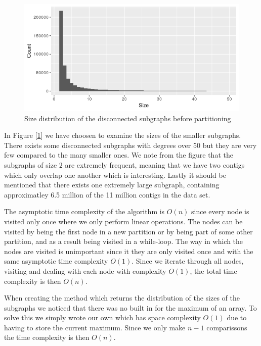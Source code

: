 \documentclass[a4paper,10pt]{article}
\newcommand\bref[1]{[\ref{#1}]}
\begin{document}
\begin{figure}[H]
	\centering
	\includegraphics[width=0.85\linewidth]{sizesprior.png}
	\caption{Size distribution of the disconnected subgraphs before partitioning}
	\label{fig:sizeprior}
\end{figure}

In Figure \bref{fig:sizeprior} we have choosen to examine the sizes of the smaller subgraphs. 
There exists some disconnected subgraphs with degrees over 50 but they are very few compared to the many smaller ones.
We note from the figure that the subgraphs of size $2$ are extremely frequent, meaning that we have two contigs which only overlap one another which is interesting. 
Lastly it should be mentioned that there exists one extremely large subgraph, containing approximatley 6.5 million of the 11 million contigs in the data set. 

\medskip

The asymptotic time complexity of the algorithm is $O(n)$ since every node is visited only once where we only perform linear operations. The nodes can be visited by being the first node in a new partition or by being part of
some other partition, and as a result being visited in a while-loop. The way in which the nodes are visited is unimportant since it they are only visited  once and with the same asymptotic time complexity $O(1)$. Since we iterate through all nodes, visiting and dealing with each node with complexity $O(1)$, the total time complexity is then $O(n)$.

\medskip

When creating the method which returns the distribution of the sizes of the subgraphs we noticed that there was no built in for the maximum of an array. To solve this we simply wrote our own which has space complexity $O(1)$ due to having to store the current maximum. Since we only make $n-1$ comparissons the time complexity is then $O(n)$.

\medskip
\end{document}
